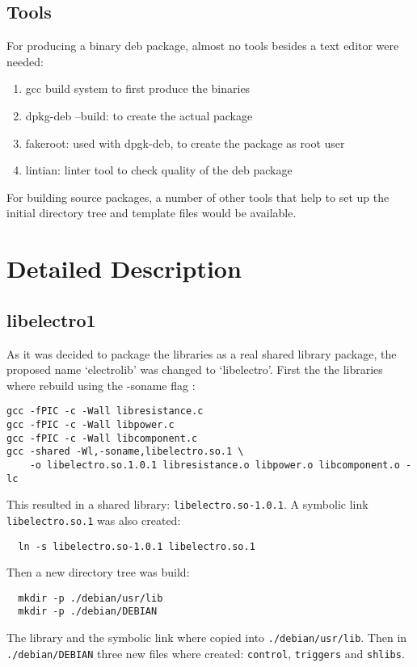 \documentclass[a4paper,11pt,twoside]{article}
\begin{document}
\subsection{Tools}
For producing a binary deb package, almost no tools besides a text editor were
needed:
\begin{enumerate}
\item gcc build system to first produce the binaries
\item dpkg-deb --build: to create the actual package
\item fakeroot: used with dpgk-deb, to create the package as root user
\item lintian: linter tool to check quality of the deb package
\end{enumerate}

For building source packages, a number of other tools that help to set up the
initial directory tree and template files would be available.

\section{Detailed Description}
\subsection{libelectro1}
As it was decided to package the libraries as a real shared library package, the
proposed name `electrolib' was changed to `libelectro'.  First the the libraries
where rebuild using the -soname flag \cite{tldpShlibs}:
\begin{verbatim}
gcc -fPIC -c -Wall libresistance.c
gcc -fPIC -c -Wall libpower.c
gcc -fPIC -c -Wall libcomponent.c
gcc -shared -Wl,-soname,libelectro.so.1 \
    -o libelectro.so.1.0.1 libresistance.o libpower.o libcomponent.o -lc
\end{verbatim}

This resulted in a shared library: \verb+libelectro.so-1.0.1+. A symbolic
link \verb+libelectro.so.1+ was also created:

\begin{verbatim}
  ln -s libelectro.so-1.0.1 libelectro.so.1
\end{verbatim}

Then a new directory tree was build:
\begin{verbatim}
  mkdir -p ./debian/usr/lib
  mkdir -p ./debian/DEBIAN
\end{verbatim}
The library and the symbolic link where copied into \verb+./debian/usr/lib+. Then
in \verb+./debian/DEBIAN+ three new files where created: \verb+control+,
\verb+triggers+ and \verb+shlibs+.
\end{document}
